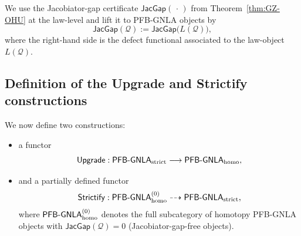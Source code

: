 \documentclass[11pt]{book}
\theoremstyle{plain}
\theoremstyle{definition}
\begin{document}
We use the Jacobiator-gap certificate \(\mathsf{JacGap}(\,\cdot\,)\)
from Theorem~\ref{thm:GZ-OHU} at the law-level and lift it to
PFB-GNLA objects by
\[
  \mathsf{JacGap}(\mathcal{Q})
  :=
  \mathsf{JacGap}\bigl(L(\mathcal{Q})\bigr),
\]
where the right-hand side is the defect functional associated to the
law-object \(L(\mathcal{Q})\).



\subsection*{Definition of the Upgrade and Strictify constructions}


We now define two constructions:

\begin{itemize}
  \item a functor
    \[
      \mathsf{Upgrade} :
      \mathsf{PFB\text- GNLA}_{\mathrm{strict}}
      \longrightarrow
      \mathsf{PFB\text- GNLA}_{\mathrm{homo}},
    \]
  \item and a partially defined functor
    \[
      \mathsf{Strictify} :
      \mathsf{PFB\text- GNLA}_{\mathrm{homo}}^{(0)}
      \dashrightarrow
      \mathsf{PFB\text- GNLA}_{\mathrm{strict}},
    \]
    where \(\mathsf{PFB\text- GNLA}_{\mathrm{homo}}^{(0)}\) denotes
    the full subcategory of homotopy PFB-GNLA objects with
    \(\mathsf{JacGap}(\mathcal{Q})=0\) (Jacobiator-gap-free objects).
\end{itemize}
\end{document}
